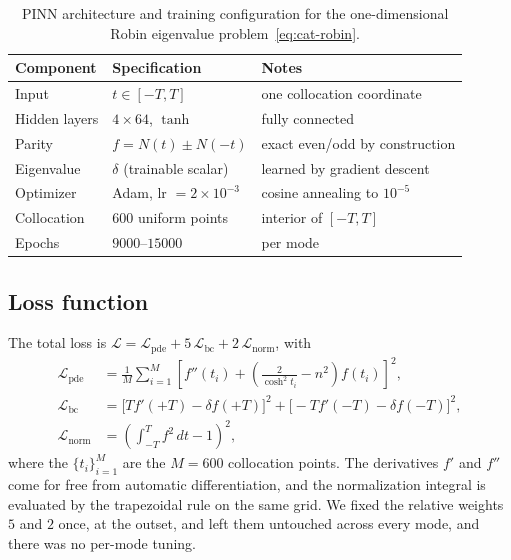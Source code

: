 \documentclass[11pt]{article}
\theoremstyle{definition}
\theoremstyle{plain}
\begin{document}
\begin{table}[ht]
	\centering
	\begin{tabular}{lll}
		\hline
		\textbf{Component} & \textbf{Specification}      & \textbf{Notes}                 \\
		\hline
		Input              & $t \in [-T, T]$             & one collocation coordinate     \\
		Hidden layers      & $4 \times 64$, $\tanh$      & fully connected                \\
		Parity             & $f = N(t) \pm N(-t)$        & exact even/odd by construction \\
		Eigenvalue         & $\delta$ (trainable scalar) & learned by gradient descent    \\
		Optimizer          & Adam, lr $= 2\times10^{-3}$ & cosine annealing to $10^{-5}$  \\
		Collocation        & $600$ uniform points        & interior of $[-T, T]$          \\
		Epochs             & $9000$--$15000$             & per mode                       \\
		\hline
	\end{tabular}
	\caption{PINN architecture and training configuration for the one-dimensional Robin eigenvalue problem~\eqref{eq:cat-robin}.}
	\label{tab:arch}
\end{table}

\subsection{Loss function}

The total loss is $\mathcal{L} = \mathcal{L}_{\mathrm{pde}} + 5\,\mathcal{L}_{\mathrm{bc}} + 2\,\mathcal{L}_{\mathrm{norm}}$, with
\begin{align}
	\mathcal{L}_{\mathrm{pde}}  & = \frac{1}{M}\sum_{i=1}^{M} \left[ f''(t_i) + \left( \frac{2}{\cosh^2 t_i} - n^2 \right) f(t_i) \right]^2, \\
	\mathcal{L}_{\mathrm{bc}}   & = \bigl[ T f'(+T) - \delta f(+T) \bigr]^2 + \bigl[ -T f'(-T) - \delta f(-T) \bigr]^2,                      \\
	\mathcal{L}_{\mathrm{norm}} & = \left( \int_{-T}^{T} f^2 \, dt - 1 \right)^2,
\end{align}
where the $\{t_i\}_{i=1}^{M}$ are the $M = 600$ collocation points. The derivatives $f'$ and $f''$ come for free from automatic differentiation, and the normalization integral is evaluated by the trapezoidal rule on the same grid. We fixed the relative weights $5$ and $2$ once, at the outset, and left them untouched across every mode, and there was no per-mode tuning.
\end{document}
